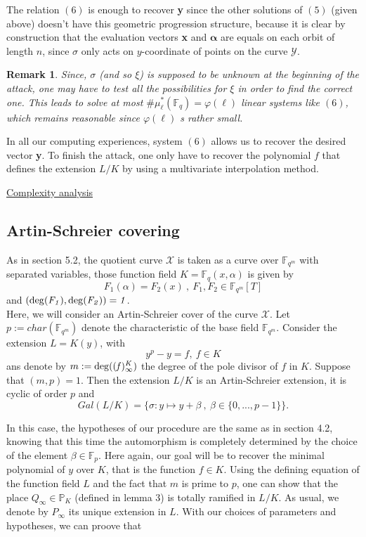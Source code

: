 \documentclass[10pt]{article}
\newtheorem{rq1}{Remark}[]
\newcommand{\s}{\vspace{0.3cm}}
\newcommand{\fqm}{\mathbb{F}_{q^m}}
\newcommand{\fq}{\mathbb{F}_q}
\newcommand{\X}{\mathcal{X}}
\newcommand{\Y}{\mathcal{Y}}
\begin{document}
The relation $(6)$ is enough to recover \textbf{y} since the other solutions of $(5)$ (given above) doesn't have this geometric progression structure, because it is clear by construction that the evaluation vectors \textbf{x} and $\boldsymbol{\alpha}$ are equals on each orbit of length $n$, since $\sigma$ only acts on $y$-coordinate of points on the curve $\Y$. 

\s

\begin{rq1} \rm
Since, $\sigma$ (and so $\xi$) is supposed to be unknown at the beginning of the attack, one may have to test all the possibilities for $\xi$ in order to find the correct one. This leads to solve at most $\#\mu^*_{\ell}(\fq) = \varphi(\ell)$ linear systems like $(6)$, which remains reasonable since $\varphi(\ell)$ s rather small.
\end{rq1}

\s

In all our computing experiences, system $(6)$ allows us to recover the desired vector \textbf{y}. To finish the attack, one only have to recover the polynomial $f$ that defines the extension $L/K$ by using a multivariate interpolation method. 

\s

\underline{Complexity analysis}

\s


\subsection{Artin-Schreier covering}

\s

As in section 5.2, the quotient curve $\X$ is taken as a curve over $\fqm$ with separated variables, those function field $K = \fq(x,\alpha)$ is given by 
\[F_1(\alpha) = F_2(x) \ , \ F_1,F_2 \in \fqm[T]\]
and $(\rm{deg}\it(F_1),\rm{deg}\it(F_2))=1$. \\ 
Here, we will consider an Artin-Schreier cover of the curve $\X$.
Let $p:=char(\fqm)$ denote the characteristic of the base field $\fqm$. Consider the extension $L=K(y)$, with
\[y^p-y = f , \ f \in K\]
ans denote by $m:=\rm{deg}\it((f)^K_{\infty})$ the degree of the pole divisor of $f$ in $K$. Suppose that $(m,p)=1$. Then the extension $L/K$ is an Artin-Schreier extension, it is cyclic of order $p$ and 
\[Gal(L/K) = \{ \sigma : y \mapsto y + \beta \ , \ \beta \in \{0,...,p-1\}\}.\]

\s

In this case, the hypotheses of our procedure are the same as in section 4.2, knowing that this time the automorphism is completely determined by the choice of the element $\beta \in \mathbb{F}_p$. Here again, our goal will be to recover the minimal polynomial of $y$ over $K$, that is the function $f \in K$. Using the defining equation of the function field $L$ and the fact that $m$ is prime to $p$, one can show that the place $Q_{\infty} \in \mathbb{P}_K$ (defined in lemma 3) is totally ramified in $L/K$. As usual, we denote by $P_{\infty}$ its unique extension in $L$. With our choices of parameters and hypotheses, we can proove that
\end{document}
